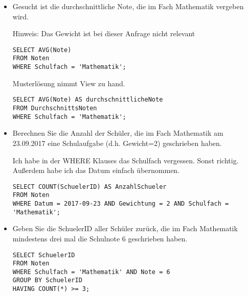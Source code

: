 \documentclass{lehramt-informatik}
\begin{document}
\begin{enumerate}
\begin{itemize}

%

\item Gesucht ist die durchschnittliche Note, die im Fach Mathematik
vergeben wird.

Hinweis: Das Gewicht ist bei dieser Anfrage nicht relevant

\begin{antwort}
\begin{verbatim}
SELECT AVG(Note)
FROM Noten
WHERE Schulfach = 'Mathematik';
\end{verbatim}
\end{antwort}

Musterlösung nimmt View zu hand.

\begin{antwort}[muster]
\begin{verbatim}
SELECT AVG(Note) AS durchschnittlicheNote
FROM DurchschnittsNoten
WHERE Schulfach = 'Mathematik';
\end{verbatim}
\end{antwort}

%

\item Berechnen Sie die Anzahl der Schüler, die im Fach Mathematik am
23.09.2017 eine Schulaufgabe (d.h. Gewicht=2) geschrieben haben.

\begin{antwort}[muster]
Ich habe in der WHERE Klauses das Schulfach vergessen. Sonst richtig.
Außerdem habe ich das Datum einfach übernommen.
\begin{verbatim}
SELECT COUNT(SchuelerID) AS AnzahlSchueler
FROM Noten
WHERE Datum = 2017-09-23 AND Gewichtung = 2 AND Schulfach = 'Mathematik';
\end{verbatim}
\end{antwort}

%

\item Geben Sie die SchuelerID aller Schüler zurück, die im Fach
Mathematik mindestens drei mal die Schulnote 6 geschrieben haben.

\begin{antwort}[muster]
\begin{verbatim}
SELECT SchuelerID
FROM Noten
WHERE Schulfach = 'Mathematik' AND Note = 6
GROUP BY SchuelerID
HAVING COUNT(*) >= 3;
\end{verbatim}
\end{antwort}


\end{itemize}
\end{enumerate}
\end{document}
